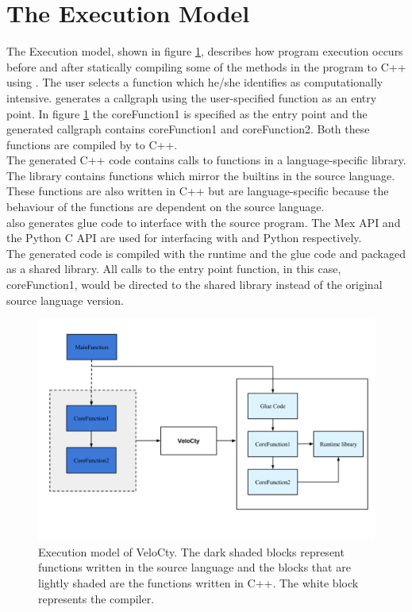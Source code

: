 \section{The Execution Model} 
The Execution model, shown in figure \ref{Fig:working}, describes how program execution occurs before and after statically compiling some of the methods in the program to C++ using \velocty. The user selects a function which he/she identifies as computationally intensive. \velocty generates a callgraph using the user-specified function as an entry point. In figure \ref{Fig:working} the coreFunction1 is specified as the entry point and the  generated callgraph contains coreFunction1 and coreFunction2. Both these functions are compiled by \velocty to C++.\\
The generated C++ code contains calls to functions in a language-specific library. The library contains functions which mirror the builtins in the source language. These functions are also written in C++ but are language-specific because the behaviour of the functions are dependent on the source language.\\
\velocty also generates glue code to interface with the source program. The Mex\cite{mex} API and the Python\cite{python} C API are used for interfacing with \matlab and Python\cite{python} respectively.\\
The generated code is compiled with the runtime and the glue code and packaged as a shared library. All calls to the entry point function, in this case, coreFunction1, would be directed to the shared library instead of the original source language version.\\
\begin{figure}[htbp]
\begin{center}
\includegraphics[scale=0.4]{Figures/WorkingDetails.png}
\caption[Execution Model]{Execution model of VeloCty. The dark shaded blocks represent functions written in the source language and the blocks that are lightly shaded are the functions written in C++. The white block represents the \velocty compiler.}\label{Fig:working}
\end{center}
\end{figure}
